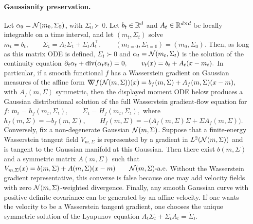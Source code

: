 \paragraph{Gaussianity preservation.}
\begin{prop}\label{prop-gaussian-affine-closure}
Let $\alpha_0=\mathcal{N}(m_0,\Sigma_0)$, with $\Sigma_0\succ0$. Let $b_t\in\mathbb{R}^d$ and $A_t\in\mathbb{R}^{d\times d}$ be locally integrable on a time interval, and let $(m_t,\Sigma_t)$ solve
\(\dot m_t=b_t, \qquad \dot\Sigma_t=A_t\Sigma_t+\Sigma_tA_t^\top, \qquad (m_{t=0},\Sigma_{t=0})=(m_0,\Sigma_0).\)
Then, as long as this matrix ODE is defined, $\Sigma_t\succ0$ and
\(\alpha_t=\mathcal{N}(m_t,\Sigma_t)\)
is the solution of the continuity equation
\(\partial_t\alpha_t+\operatorname{div}(\alpha_t v_t)=0, \qquad v_t(x)=b_t+A_t(x-m_t).\)
In particular, if a smooth functional $f$ has a Wasserstein gradient on Gaussian measures of the affine form
\(\mathord{\nabla\mkern-9.3mu\nabla} f(\mathcal{N}(m,\Sigma))(x) = b_f(m,\Sigma)+A_f(m,\Sigma)(x-m),\)
with $A_f(m,\Sigma)$ symmetric, then the displayed moment ODE below produces a Gaussian distributional solution of the full Wasserstein gradient-flow equation for $f$:
\(\dot m_t=h_f(m_t,\Sigma_t), \qquad \dot\Sigma_t=H_f(m_t,\Sigma_t),\)
where \(h_f(m,\Sigma)=-b_f(m,\Sigma), \qquad H_f(m,\Sigma) = -\bigl(A_f(m,\Sigma)\Sigma+\Sigma A_f(m,\Sigma)\bigr).\)
Conversely, fix a non-degenerate Gaussian \(\mathcal{N}(m,\Sigma)\). Suppose that a finite-energy Wasserstein tangent field \(V_{m,\Sigma}\) is represented by a gradient in \(L^2(\mathcal{N}(m,\Sigma))\) and is tangent to the Gaussian manifold at this Gaussian. Then there exist \(b(m,\Sigma)\) and a symmetric matrix \(A(m,\Sigma)\) such that
\(V_{m,\Sigma}(x)=b(m,\Sigma)+A(m,\Sigma)(x-m) \qquad \mathcal{N}(m,\Sigma)\text{-a.e.}\)
Without the Wasserstein gradient representative, this converse is false because one may add velocity fields with zero \(\mathcal{N}(m,\Sigma)\)-weighted divergence.
Finally, any smooth Gaussian curve with positive definite covariance can be generated by an affine velocity. If one wants the velocity to be a Wasserstein tangent gradient, one chooses the unique symmetric solution of the Lyapunov equation
\(A_t\Sigma_t+\Sigma_t A_t=\dot\Sigma_t.\)
\end{prop}
